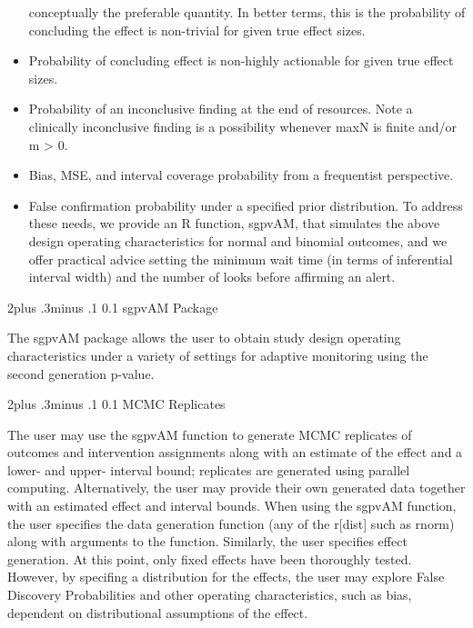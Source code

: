 \documentclass[12pt,oneside]{book}
\makeatletter
\newlength{\li}\setlength{\li}{14.48pt}
\newlength{\di}\setlength{\di}{-3.5mm}
\renewcommand\section{ \@startsection {section}{1}{\z@}%
    {2\@bls  plus .3\@bls minus .1\@bls}%
    {0.1\@bls}%
    {\centering\normalfont}}
\renewcommand\subsection{\@startsection {subsection}{2}{\z@}%
    {2\@bls  plus .3\@bls minus .1\@bls}%
    {0.1\@bls}%
    {\noindent\normalfont}}
\theoremstyle{definition}
\theoremstyle{definition}
\theoremstyle{definition}
\theoremstyle{remark}
\makeatother
\begin{document}
\begin{itemize}
  conceptually the preferable quantity. In better terms, this is the
  probability of concluding the effect is non-trivial for given true
  effect sizes.
\item
  Probability of concluding effect is non-highly actionable for given
  true effect sizes.
\item
  Probability of an inconclusive finding at the end of resources. Note a
  clinically inconclusive finding is a possibility whenever maxN is
  finite and/or m \textgreater{} 0.
\item
  Bias, MSE, and interval coverage probability from a frequentist
  perspective.
\item
  False confirmation probability under a specified prior distribution.
  To address these needs, we provide an R function, sgpvAM, that
  simulates the above design operating characteristics for normal and
  binomial outcomes, and we offer practical advice setting the minimum
  wait time (in terms of inferential interval width) and the number of
  looks before affirming an alert.
\end{itemize}

\hypertarget{sgpvam-package}{%
\section{sgpvAM Package}\label{sgpvam-package}}

The sgpvAM package allows the user to obtain study design operating
characteristics under a variety of settings for adaptive monitoring
using the second generation p-value.

\hypertarget{mcmc-replicates}{%
\subsection{MCMC Replicates}\label{mcmc-replicates}}

The user may use the sgpvAM function to generate MCMC replicates of
outcomes and intervention assignments along with an estimate of the
effect and a lower- and upper- interval bound; replicates are generated
using parallel computing. Alternatively, the user may provide their own
generated data together with an estimated effect and interval bounds.
When using the sgpvAM function, the user specifies the data generation
function (any of the r{[}dist{]} such as rnorm) along with arguments to
the function. Similarly, the user specifies effect generation. At this
point, only fixed effects have been thoroughly tested. However, by
specifing a distribution for the effects, the user may explore False
Discovery Probabilities and other operating characteristics, such as
bias, dependent on distributional assumptions of the effect.
\end{document}
